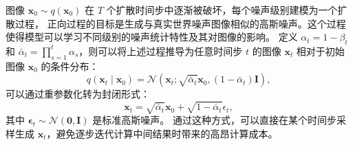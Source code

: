 图像 $\mathbf{x}_0 \sim q\left(\mathbf{x}_0\right)$ 在 $T$ 个扩散时间步中逐渐被破坏，每个噪声级别建模为一个扩散过程，
正向过程的目标是生成与真实世界噪声图像相似的高斯噪声。这个过程使得模型可以学习不同级别的噪声统计特性及其对图像的影响。
定义 $\alpha_t=1-\beta_t$ 和  $\bar{\alpha}_t = \prod_{s=1}^t \alpha_s$，则可以将上述过程推导为任意时间步 $t$ 的图像 $\mathbf{x}_t$ 相对于初始图像 $\mathbf{x}_0$ 的条件分布：
\begin{equation}
    \label{eq:q}
q\left(\mathbf{x}_t \mid \mathbf{x}_0\right)=\mathcal{N}\left(\mathbf{x}_t ; \sqrt{\bar{\alpha}_t} \mathbf{x}_0,\left(1-\bar{\alpha}_t\right) \mathbf{I}\right),
\end{equation}
可以通过重参数化转为封闭形式：
\begin{equation}
    \label{eq:x0_xt}
    \mathbf{x}_t=\sqrt{\bar{\alpha}_t} \mathbf{x}_0+\sqrt{1-\bar{\alpha}_t} \epsilon_t,
\end{equation}
其中 $\boldsymbol{\epsilon}_t \sim \mathcal{N}(\mathbf{0}, \mathbf{I})$ 是标准高斯噪声。
通过这种方式，可以直接在某个时间步采样生成 $\mathbf{x}_t$，避免逐步迭代计算中间结果时带来的高昂计算成本。


